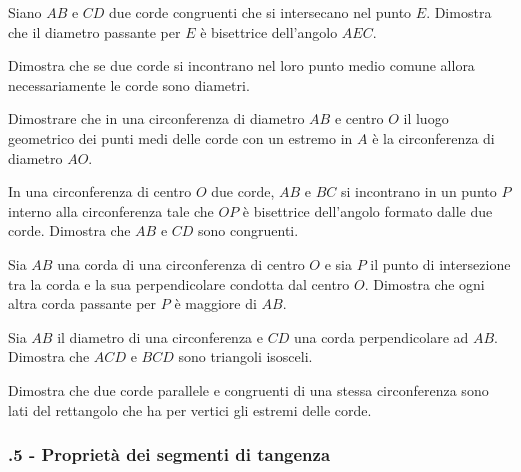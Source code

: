 \begin{multicols}{2}
\begin{esercizio}
\label{ese:5.13}
Siano $AB$ e $CD$ due corde congruenti che si intersecano nel punto $E$. Dimostra che il diametro passante per $E$ è bisettrice dell'angolo $AEC$.
\end{esercizio}

\begin{esercizio}
\label{ese:5.14}
Dimostra che se due corde si incontrano nel loro punto medio comune allora necessariamente le corde sono diametri.
\end{esercizio}

\begin{esercizio}
\label{ese:5.15}
Dimostrare che in una circonferenza di diametro $AB$ e centro $O$ il luogo geometrico dei punti medi delle corde con un estremo in $A$ è la circonferenza di diametro $AO$.
\end{esercizio}

\begin{esercizio}
\label{ese:5.16}
In una circonferenza di centro $O$ due corde, $AB$ e $BC$ si incontrano in un punto $P$ interno alla circonferenza tale che $OP$ è bisettrice dell'angolo formato dalle due corde. Dimostra che $AB$ e $CD$ sono congruenti.
\end{esercizio}

\begin{esercizio}
\label{ese:5.17}
Sia $AB$ una corda di una circonferenza di centro $O$ e sia $P$ il punto di intersezione tra la corda e la sua perpendicolare condotta dal centro $O$. Dimostra che ogni altra corda passante per $P$ è maggiore di $AB$.
\end{esercizio}

\begin{esercizio}
\label{ese:5.18}
Sia $AB$ il diametro di una circonferenza e $CD$ una corda perpendicolare ad $AB$. Dimostra che $ACD$ e $BCD$ sono triangoli isosceli.
\end{esercizio}

\begin{esercizio}
\label{ese:5.19}
Dimostra che due corde parallele e congruenti di una stessa circonferenza sono lati del rettangolo che ha per vertici gli estremi delle corde.
\end{esercizio}

\subsubsection*{\thechapter.5 - Proprietà dei segmenti di tangenza}


\end{multicols}
